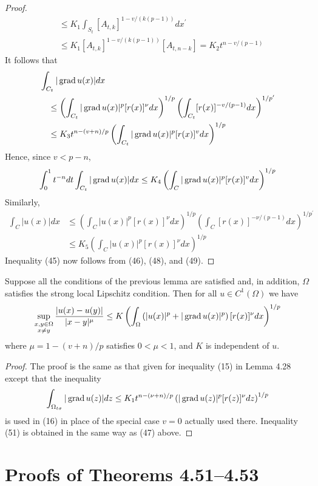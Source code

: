 \begin{proof}
\[\begin{aligned}
  & \leq K_1 \int_{S_t}\left[A_{t, k}\right]^{1-v /(k(p-1))} d x^{\prime} \\
  & \leq K_1\left[A_{t, k}\right]^{1-v /(k(p-1))}\left[A_{t, n-k}\right]=K_2 t^{n-v /(p-1)}
  \end{aligned}
  \]
  It follows that
  \[
  \begin{aligned}
  & \int_{C_t}|\operatorname{grad} u(x)| d x \\
  & \quad \leq\left(\int_{C_t}|\operatorname{grad} u(x)|^p[r(x)]^\nu d x\right)^{1 / p}\left(\int_{C_t}[r(x)]^{-v /(p-1)} d x\right)^{1 / p^{\prime}} \\
  & \quad \leq K_3 t^{n-(v+n) / p}\left(\int_{C_t}|\operatorname{grad} u(x)|^p[r(x)]^v d x\right)^{1 / p}
  \end{aligned}
  \]
  Hence, since $v<p-n$,
  \[
  \int_0^1 t^{-n} d t \int_{C_t}|\operatorname{grad} u(x)| d x \leq K_4\left(\int_C|\operatorname{grad} u(x)|^p[r(x)]^v d x\right)^{1 / p}
  \]
  Similarly,
  \[
  \begin{aligned}
  \int_C|u(x)| d x & \leq\left(\int_C|u(x)|^p[r(x)]^\nu d x\right)^{1 / p}\left(\int_C[r(x)]^{-\nu /(p-1)} d x\right)^{1 / p^{\prime}} \\
  & \leq K_5\left(\int_C|u(x)|^p[r(x)]^\nu d x\right)^{1 / p}
  \end{aligned}
  \]
  Inequality (45) now follows from (46), (48), and (49).
\end{proof}


\begin{lemma}
  Suppose all the conditions of the previous lemma are satisfied and, in addition, $\Omega$ satisfies the strong local Lipschitz condition. Then for all $u \in C^1(\Omega)$ we have
  \[
  \sup _{\substack{x, y \in \Omega \\ x \neq y}} \frac{|u(x)-u(y)|}{|x-y|^\mu} \leq K\left(\int_{\Omega}\left(|u(x)|^p+|\operatorname{grad} u(x)|^p\right)[r(x)]^\nu d x\right)^{1 / p}
  \]
  where $\mu=1-(v+n) / p$ satisfies $0<\mu<1$, and $K$ is independent of $u$.
\end{lemma}

\begin{proof}
  The proof is the same as that given for inequality (15) in Lemma 4.28 except that the inequality
  \[
  \int_{\Omega_{t \sigma}}|\operatorname{grad} u(z)| d z \leq K_1 t^{n-(\nu+n) / p}\left(|\operatorname{grad} u(z)|^p[r(z)]^\nu d z\right)^{1 / p}
  \]
  is used in (16) in place of the special case $v=0$ actually used there. Inequality (51) is obtained in the same way as (47) above.
\end{proof}


\section{Proofs of Theorems 4.51--4.53}


